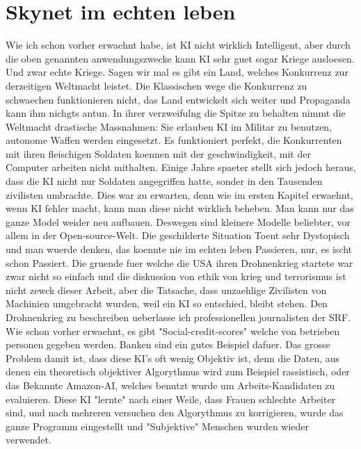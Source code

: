 \documentclass{report}
\begin{document}
\section{Skynet im echten leben}
Wie ich schon vorher erwaehnt habe, ist KI nicht wirklich Intelligent, aber durch die oben genannten anwendungszwecke kann KI sehr guet sogar Kriege ausloesen. Und zwar echte Kriege.
\newline
Sagen wir mal es gibt ein Land, welches Konkurrenz zur derzeitigen Weltmacht leistet. Die Klassischen wege die Konkurrenz zu schwaechen funktionieren nicht, das Land entwickelt sich weiter und Propaganda kann ihm nichgts antun. In ihrer verzweifulng die Spitze zu behalten nimmt die Weltmacht drastische Massnahmen: Sie erlauben KI im Militar zu benutzen, autonome Waffen werden eingesetzt. Es funktioniert perfekt, die Konkurrenten mit ihren fleischigen Soldaten koennen mit der geschwindigkeit, mit der Computer arbeiten nicht mithalten. Einige Jahre spaeter stellt sich jedoch heraus, dass die KI nicht nur Soldaten angegriffen hatte, sonder in den Tausenden zivilisten umbrachte. Dies war zu erwarten, denn wie im ersten Kapitel erwaehnt, wenn KI fehler macht, kann man diese nicht wirklich beheben. Man kann nur das ganze Model weider neu aufbauen. Deswegen sind kleinere Modelle beliebter, vor allem in der Open-source-Welt.
\newline
\newline
Die geschilderte Situation Toent sehr Dystopisch und man wuerde denken, das koennte nie im echten leben Passieren, nur, es ischt schon Passiert. Die gruende fuer welche die USA ihren Drohnenkrieg startete war zwar nicht so einfach und die diskussion von ethik von krieg und terrorismus ist nicht zewck dieser Arbeit, aber die Tatsache, dass unzaehlige Zivilisten von Machinien umgebracht wurden, weil ein KI so entschied, bleibt stehen.
Den Drohnenkrieg zu beschreiben ueberlasse ich professionellen journalisten der SRF. \citep{drones-srf}
\newline
Wie schon vorher erwaehnt, es gibt "Social-credit-scores" welche von betrieben personen gegeben werden. Banken sind ein gutes Beispiel dafuer. Das grosse Problem damit ist, dass diese KI's oft wenig Objektiv ist, denn die Daten, aus denen ein theoretisch objektiver Algorythmus wird zum Beispiel rassistisch, oder das Bekannte Amazon-AI, welches benutzt wurde um Arbeits-Kandidaten zu evaluieren. Diese KI "lernte" nach einer Weile, dass Frauen schlechte Arbeiter sind, und nach mehreren versuchen den Algorythmus zu korrigieren, wurde das ganze Programm eingestellt und "Subjektive" Menschen wurden wieder verwendet.
\end{document}
